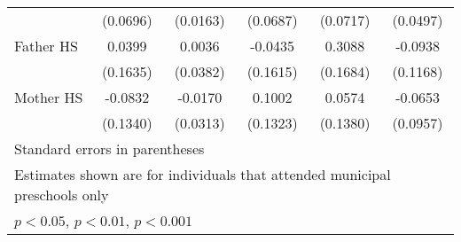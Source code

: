 \begin{table}[htbp]
\begin{tabular}{l*{5}{c}}
            &    (0.0696)         &    (0.0163)         &    (0.0687)         &    (0.0717)         &    (0.0497)         \\
\addlinespace
Father HS   &      0.0399         &      0.0036         &     -0.0435         &      0.3088         &     -0.0938         \\
            &    (0.1635)         &    (0.0382)         &    (0.1615)         &    (0.1684)         &    (0.1168)         \\
\addlinespace
Mother HS   &     -0.0832         &     -0.0170         &      0.1002         &      0.0574         &     -0.0653         \\
            &    (0.1340)         &    (0.0313)         &    (0.1323)         &    (0.1380)         &    (0.0957)         \\
\bottomrule
\multicolumn{6}{l}{\footnotesize Standard errors in parentheses}\\
\multicolumn{6}{l}{\footnotesize Estimates shown are for individuals that attended municipal preschools only}\\
\multicolumn{6}{l}{\footnotesize \sym{*} \(p<0.05\), \sym{**} \(p<0.01\), \sym{***} \(p<0.001\)}\\
\end{tabular}
\end{table}
